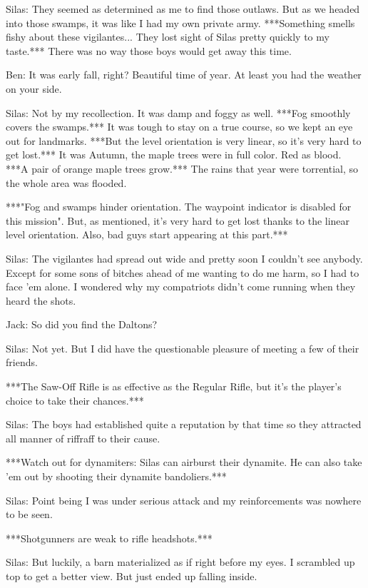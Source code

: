 \documentclass{article}
\begin{document}
Silas: They seemed as determined as me to find those outlaws. But as we headed into those swamps, it was like I had my own private army. ***Something smells fishy about these vigilantes... They lost sight of Silas pretty quickly to my taste.*** There was no way those boys would get away this time.

Ben: It was early fall, right? Beautiful time of year. At least you had the weather on your side.

Silas: Not by my recollection. It was damp and foggy as well. ***Fog smoothly covers the swamps.*** It was tough to stay on a true course, so we kept an eye out for landmarks. ***But the level orientation is very linear, so it's very hard to get lost.*** It was Autumn, the maple trees were in full color. Red as blood. ***A pair of orange maple trees grow.*** The rains that year were torrential, so the whole area was flooded.

***"Fog and swamps hinder orientation. The waypoint indicator is disabled for this mission". But, as mentioned, it's very hard to get lost thanks to the linear level orientation. Also, bad guys start appearing at this part.***

Silas: The vigilantes had spread out wide and pretty soon I couldn't see anybody. Except for some sons of bitches ahead of me wanting to do me harm, so I had to face 'em alone. I wondered why my compatriots didn't come running when they heard the shots.

Jack: So did you find the Daltons?

Silas: Not yet. But I did have the questionable pleasure of meeting a few of their friends.

***The Saw-Off Rifle is as effective as the Regular Rifle, but it's the player's choice to take their chances.***

Silas: The boys had established quite a reputation by that time so they attracted all manner of riffraff to their cause.

***Watch out for dynamiters: Silas can airburst their dynamite. He can also take 'em out by shooting their dynamite bandoliers.***

Silas: Point being I was under serious attack and my reinforcements was nowhere to be seen.

***Shotgunners are weak to rifle headshots.***

Silas: But luckily, a barn materialized as if right before my eyes. I scrambled up top to get a better view. But just ended up falling inside.
\end{document}
